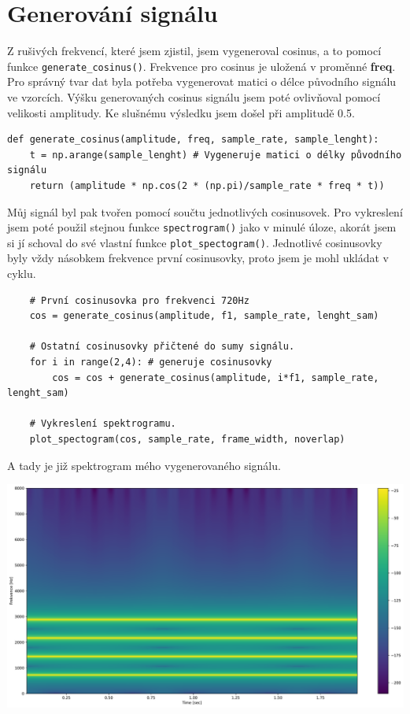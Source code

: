 \documentclass[a4paper, 11pt]{article}
\begin{document}
\section{Generování signálu}

Z rušivých frekvencí, které jsem zjistil, jsem vygeneroval cosinus, a to pomocí funkce \texttt{generate\_cosinus()}. Frekvence pro cosinus je uložená v proměnné \textbf{freq}. Pro správný tvar dat byla potřeba vygenerovat matici o délce původního signálu ve vzorcích. Výšku generovaných cosinus signálu jsem poté ovlivňoval pomocí velikosti amplitudy. Ke slušnému výsledku jsem došel při amplitudě 0.5.

\begin{verbatim}
def generate_cosinus(amplitude, freq, sample_rate, sample_lenght):
    t = np.arange(sample_lenght) # Vygeneruje matici o délky původního signálu 
    return (amplitude * np.cos(2 * (np.pi)/sample_rate * freq * t))
\end{verbatim}

Můj signál byl pak tvořen pomocí součtu jednotlivých cosinusovek. Pro vykreslení jsem poté použil stejnou funkce \texttt{spectrogram()} jako v minulé úloze, akorát jsem si jí schoval do své vlastní funkce \texttt{plot\_spectogram()}. Jednotlivé cosinusovky byly vždy násobkem frekvence první cosinusovky, proto jsem je mohl ukládat v cyklu.

\begin{verbatim}
    # První cosinusovka pro frekvenci 720Hz
    cos = generate_cosinus(amplitude, f1, sample_rate, lenght_sam)

    # Ostatní cosinusovky přičtené do sumy signálu.
    for i in range(2,4): # generuje cosinusovky
        cos = cos + generate_cosinus(amplitude, i*f1, sample_rate, lenght_sam)
    
    # Vykreslení spektrogramu.
    plot_spectogram(cos, sample_rate, frame_width, noverlap) 
\end{verbatim}

A tady je již spektrogram mého vygenerovaného signálu. \\
\begin{center}
        \includegraphics[scale=0.43]{img/4_4cos.pdf} \\
\end{center}
\end{document}

